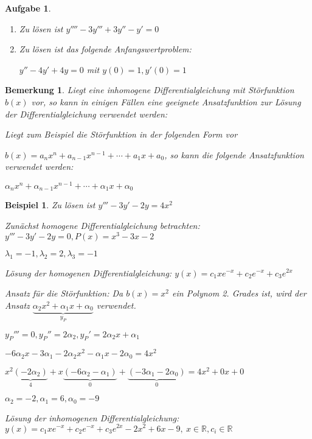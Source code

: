 \documentclass[12pt,a4paper]{scrreprt}
\newtheorem{bemerkung}[defi]{Bemerkung}
\newtheorem{beispiel}[defi]{Beispiel}
\newtheorem{aufg}[defi]{Aufgabe}
\begin{document}
	\begin{aufg}
		\begin{enumerate}
			\begin{enumerate}[label=\emph{(\roman*)}]
				\item Zu lösen ist $y''''-3y'''+3y''-y'=0$
				\item Zu lösen ist das folgende Anfangswertproblem:
				
				$y''-4y'+4y=0$ mit $y(0)=1,y'(0)=1$
			\end{enumerate}
		\end{enumerate}
	\end{aufg}

	 \begin{bemerkung}
		 Liegt eine inhomogene Differentialgleichung mit Störfunktion $b(x)$ vor, so kann in einigen Fällen eine geeignete Ansatzfunktion zur Lösung der Differentialgleichung verwendet werden:

		 Liegt zum Beispiel die Störfunktion in der folgenden Form vor

		 $b(x)=a_n x^n + a_{n-1} x^{n-1} + \cdots + a_1 x + a_0$, so kann die folgende Ansatzfunktion verwendet werden:

		 $\alpha_n x^n + \alpha_{n-1} x^{n-1} + \cdots + \alpha_1 x + \alpha_0$
	 \end{bemerkung}

	 \begin{beispiel}
		Zu lösen ist $y'''-3y'-2y=4x^2$

		Zunächst homogene Differentialgleichung betrachten: $y'''-3y'-2y=0,P(x)=x^3-3x-2$

		$\lambda_1=-1,\lambda_2=2,\lambda_3=-1$

		Lösung der homogenen Differentialgleichung: $y(x)=c_1xe^{-x}+c_2e^{-x}+c_3e^{2x}$

		Ansatz für die Störfunktion: Da $b(x)=x^2$ ein Polynom 2. Grades ist, wird der Ansatz $\underbrace{\alpha_2x^2+\alpha_1x+\alpha_0}_{y_P}$ verwendet.

		${y_P}'''=0,{y_P}''=2\alpha_2,{y_P}'=2\alpha_2x+\alpha_1$

		$-6\alpha_2x-3\alpha_1-2\alpha_2x^2-\alpha_1x-2\alpha_0=4x^2$

		$x^2\underbrace{(-2\alpha_2)}_4+x\underbrace{(-6\alpha_2-\alpha_1)}_0+\underbrace{(-3\alpha_1-2\alpha_0)}_0=4x^2+0x+0$

		$\alpha_2=-2,\alpha_1=6,\alpha_0=-9$

		Lösung der inhomogenen Differentialgleichung: $y(x)=c_1xe^{-x}+c_2e^{-x}+c_3e^{2x}-2x^2+6x-9,\ x\in\mathbb{R},c_i\in\mathbb{R}$
	 \end{beispiel}
\end{document}
